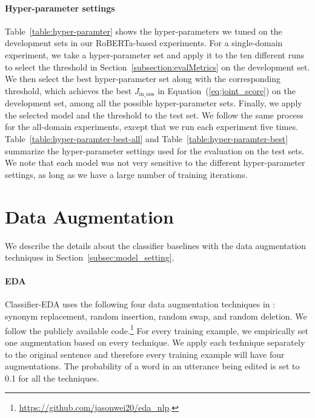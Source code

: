\paragraph{Hyper-parameter settings}\label{appendix-hyper-parameter}
Table~\ref{table:hyper-paramter} shows the hyper-parameters we tuned on the development sets in our RoBERTa-based experiments.
For a single-domain experiment, we take a hyper-parameter set and apply it to the ten different runs to select the threshold in Section~\ref{subsection:evalMetrics} on the development set.
We then select the best hyper-parameter set along with the corresponding threshold, which achieves the best $J_\mathrm{in\_oos}$ in Equation~(\ref{eq:joint_score}) on the development set, among all the possible hyper-parameter sets.
Finally, we apply the selected model and the threshold to the test set.
We follow the same process for the all-domain experiments, except that we run each experiment five times.
Table~\ref{table:hyper-paramter-best-all} and Table~\ref{table:hyper-paramter-best} summarize the hyper-parameter settings used for the evaluation on the test sets.
We note that each model was not very sensitive to the different hyper-parameter settings, as long as we have a large number of training iterations.






\section{Data Augmentation} \label{data-augmentation}

We describe the details about the classifier baselines with the data augmentation techniques in Section~\ref{subsec:model_setting}.

\paragraph{EDA}
Classifier-EDA uses the following four data augmentation techniques in \citet{eda}: synonym replacement, random insertion, random swap, and random deletion.
We follow the publicly available code.\footnote{\url{https://github.com/jasonwei20/eda_nlp}.}
For every training example, we empirically set one augmentation based on every technique.
We apply each technique separately to the original sentence and therefore every training example will have four augmentations.
The probability of a word in an utterance being edited is set to 0.1 for all the techniques.   

